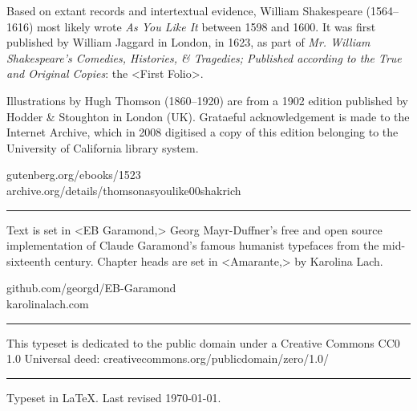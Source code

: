 \documentclass[
a5paper,
]{scrbook} %
\begin{document}
\vfill
\begin{minipage}{\textwidth}
Based on extant records and intertextual evidence, William Shakespeare (1564--1616) most likely wrote \textit{As You Like It}  between 1598 and 1600. It was first published by William Jaggard in London, in 1623, as part of \textit{Mr. William Shakespeare's Comedies, Histories, \& Tragedies; Published according to the True and Original Copies}: the <First Folio>.

Illustrations by Hugh Thomson (1860--1920) are from a 1902 edition published by Hodder \& Stoughton in London (UK). Grataeful acknowledgement is made to the Internet Archive, which in 2008 digitised a copy of this edition belonging to the University of California library system.
\end{minipage}
\vfill
gutenberg.org/ebooks/1523\\archive.org/details/thomsonasyoulike00shakrich
\vfill
\rule{0.5\textwidth}{.4pt}
\vfill
\begin{minipage}{\textwidth}
Text is set in <EB Garamond,> Georg Mayr-Duffner's free and open source implementation of Claude Garamond’s famous humanist typefaces from the mid-sixteenth century. Chapter heads are set in <Amarante,> by Karolina Lach.
\end{minipage}
\vfill
github.com/georgd/EB-Garamond\\karolinalach.com

\vfill
\rule{0.5\textwidth}{.4pt}
\vfill
\begin{minipage}{\textwidth}
This typeset is dedicated to the public domain under a Creative Commons CC0 1.0 Universal deed: creativecommons.org/publicdomain/zero/1.0/
\end{minipage}
\vfill
\rule{0.5\textwidth}{.4pt}
\vfill
Typeset in \LaTeX{}. Last revised \today.
\thispagestyle{empty}
\end{document}
